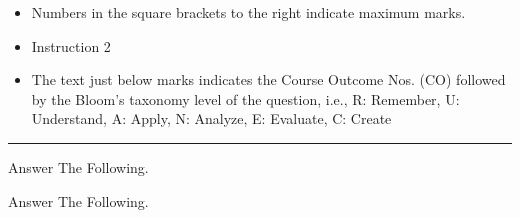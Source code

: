 \documentclass[addpoints]{exam}
\begin{document}
  \begin{itemize}
      \item Numbers in the square brackets to the right indicate maximum marks.
      \item Instruction 2
      \item The text just below marks indicates the Course Outcome Nos. (CO) followed by the Bloom’s taxonomy level of the question, i.e., R: Remember, U: Understand, A: Apply, N: Analyze,       E: Evaluate, C: Create
  \end{itemize}
  \rule{162mm}{0.3mm}
  \begin{questions}
\pointname{}
\pointsinrightmargin
{}
\question
\vspace{-\baselineskip}\vspace{1.5mm}Answer The Following.
\question
\vspace{-\baselineskip}\vspace{1.5mm}Answer The Following.
\end{questions}
\end{document}
